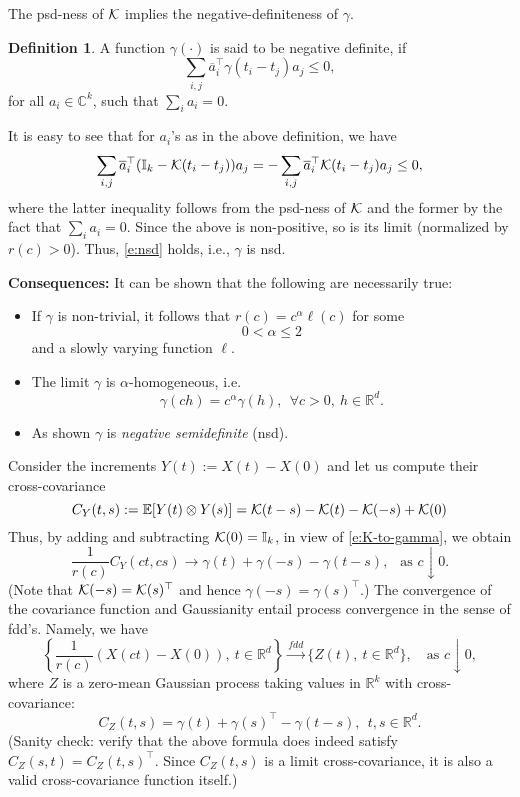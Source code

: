 \documentclass[11pt]{article}
\def\E{\mathbb E}
\def\C{\mathbb C}
\def\I{\mathbb I}
\def\R{\mathbb R}
\def\Rd{\R^d}
\theoremstyle{plain}
\theoremstyle{definition}
\newtheorem{definition}[theorem]{Definition}
\theoremstyle{condition}
\theoremstyle{remark}
\begin{document}
The psd-ness of ${\cal K}$ implies the negative-definiteness of $\gamma$. 

\begin{definition} A function $\gamma(\cdot)$ is said to be negative definite, if
\begin{equation}\label{e:nsd}
\sum_{i,j} \overline a_i^\top \gamma(t_i-t_j) a_j \le 0,
\end{equation}
for all $a_i\in \C^k$, such that $\sum_{i} a_i = 0$. 
\end{definition}

It is easy to see that for $a_i$'s as in the above definition, we have
$$
\sum_{i,j} \overline a_i^\top (\I_k - {\cal K}(t_i-t_j)) a_j = - \sum_{i,j} \overline a_i^\top {\cal K}(t_i-t_j) a_j \le 0, 
$$
where the latter inequality follows from the psd-ness of ${\cal K}$ and the former by the fact that $\sum_{i} a_i = 0$.  Since the above
is non-positive, so is its limit (normalized by $r(c)>0$).  Thus, \eqref{e:nsd} holds, i.e., $\gamma$ is nsd.  


{\bf Consequences:} It can be shown that the following are necessarily true:
\begin{itemize}
 \item If $\gamma$ is non-trivial, it follows that $r(c) = c^{\alpha} \ell(c)$ for some 
 $$
 0 <\alpha \le 2
 $$
 and a slowly varying function $\ell$.
 \item The limit $\gamma$ is $\alpha$-homogeneous, i.e.
 $$
 \gamma(c h) = c^\alpha \gamma(h),\ \ \forall c>0,\ h\in\Rd.
 $$
 \item As shown $\gamma$ is {\em negative semidefinite} (nsd).
\end{itemize}

 Consider the increments $Y(t):= X(t) -X(0)$ and let us compute their cross-covariance 
$$
C_Y(t,s):=\E[ Y(t) \otimes Y(s)] = {\cal K}(t-s) - {\cal K}(t) - {\cal K}(-s) + {\cal K}(0) 
$$
Thus, by adding and subtracting ${\cal K}(0) = \I_k$, in view of \eqref{e:K-to-gamma}, we obtain
$$
\frac{1}{r(c)}C_Y(ct,cs) \to \gamma(t) + \gamma(-s) - \gamma(t-s),\ \ \mbox{ as }c\downarrow 0.
$$
(Note that ${\cal K}(-s) = {\cal K}(s)^\top$ and hence $\gamma(-s) = \gamma(s)^\top$.)
The convergence of the covariance function and Gaussianity entail process convergence in the sense of fdd's.  Namely, 
we have
$$
\left\{  \frac{1}{r(c)} (X(ct) - X(0)),\ t\in\Rd\right\} \stackrel{fdd}{\longrightarrow} \{Z(t),\ t\in\Rd\},\  \ \ \mbox{ as }c\downarrow 0,
$$
where $Z$ is a zero-mean Gaussian process taking values in $\R^k$ with cross-covariance:
\begin{equation}\label{e:C-via-gamma}
C_Z(t,s) =\gamma(t) +\gamma(s)^\top -  \gamma(t-s),\ \ t,s\in\Rd.
\end{equation}
(Sanity check: verify that the above formula does indeed satisfy $C_Z(s,t) = C_Z(t,s)^\top$. Since $C_Z(t,s)$ is a limit 
cross-covariance, it is also a valid cross-covariance function itself.)
\end{document}
